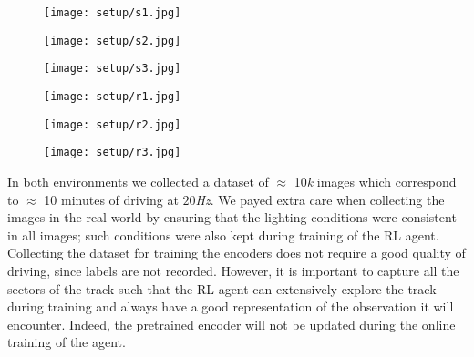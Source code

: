 \begin{figure}[h]
	\begin{minipage}{.33\textwidth}
		\centering
		\texttt{[image: setup/s1.jpg]}
	\end{minipage}%
	\begin{minipage}{.33\textwidth}
		\centering
		\texttt{[image: setup/s2.jpg]}
	\end{minipage}%
	\begin{minipage}{.33\textwidth}
		\centering
		\texttt{[image: setup/s3.jpg]}
	\end{minipage}
	\label{fig:datasetsim}
\end{figure}

\begin{figure}[h]
	\begin{minipage}{.33\textwidth}
		\centering
		\texttt{[image: setup/r1.jpg]}
	\end{minipage}%
	\begin{minipage}{.33\textwidth}
		\centering
		\texttt{[image: setup/r2.jpg]}
	\end{minipage}%
	\begin{minipage}{.33\textwidth}
		\centering
		\texttt{[image: setup/r3.jpg]}
	\end{minipage}
	\label{fig:datasetreal}
\end{figure}

In both environments we collected a dataset of $\approx$ 10\textit{k} images which correspond to $\approx$ 10 minutes of driving at $20$\textit{Hz}. We payed extra care when collecting the images in the real world by ensuring that the lighting conditions were consistent in all images; such conditions were also kept during training of the RL agent. Collecting the dataset for training the encoders does not require a good quality of driving, since labels are not recorded. However, it is important to capture all the sectors of the track such that the RL agent can extensively explore the track during training and always have a good representation of the observation it will encounter. Indeed, the pretrained encoder will not be updated during the online training of the agent.


